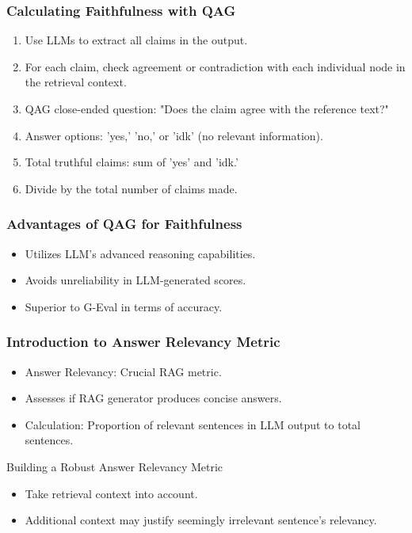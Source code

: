 \begin{frame}[fragile]\frametitle{Calculating Faithfulness with QAG}
  \begin{enumerate}
    \item Use LLMs to extract all claims in the output.
    \item For each claim, check agreement or contradiction with each individual node in the retrieval context.
    \item QAG close-ended question: "Does the claim agree with the reference text?"
    \item Answer options: 'yes,' 'no,' or 'idk' (no relevant information).
    \item Total truthful claims: sum of 'yes' and 'idk.'
    \item Divide by the total number of claims made.
  \end{enumerate}
\end{frame}

\begin{frame}[fragile]\frametitle{Advantages of QAG for Faithfulness}
  \begin{itemize}
    \item Utilizes LLM's advanced reasoning capabilities.
    \item Avoids unreliability in LLM-generated scores.
    \item Superior to G-Eval in terms of accuracy.
  \end{itemize}
\end{frame}

\begin{frame}[fragile]\frametitle{Introduction to Answer Relevancy Metric}
  \begin{itemize}
    \item Answer Relevancy: Crucial RAG metric.
    \item Assesses if RAG generator produces concise answers.
    \item Calculation: Proportion of relevant sentences in LLM output to total sentences.
  \end{itemize}
  
Building a Robust Answer Relevancy Metric
  \begin{itemize}
    \item Take retrieval context into account.
    \item Additional context may justify seemingly irrelevant sentence's relevancy.
  \end{itemize}
\end{frame}


